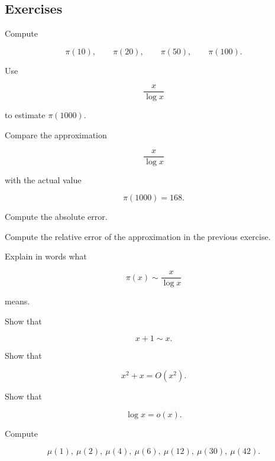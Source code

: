 \subsection{Exercises}
\label{subsec:analytic-number-theory-exercises}

\begin{exercise}[1]
Compute

\[ \pi(10),\qquad\pi(20),\qquad\pi(50),\qquad\pi(100). \]
\end{exercise}

\begin{exercise}[1]
Use

\[ \frac{x}{\log x} \]

to estimate \(\pi(1000)\).
\end{exercise}

\begin{exercise}[2]
Compare the approximation

\[ \frac{x}{\log x} \]

with the actual value

\[ \pi(1000)=168. \]

Compute the absolute error.
\end{exercise}

\begin{exercise}[2]
Compute the relative error of the approximation in the previous exercise.
\end{exercise}

\begin{exercise}[2]
Explain in words what

\[ \pi(x)\sim\frac{x}{\log x} \]

means.
\end{exercise}

\begin{exercise}[2]
Show that

\[ x+1\sim x. \]
\end{exercise}

\begin{exercise}[2]
Show that

\[ x^2+x=O(x^2). \]
\end{exercise}

\begin{exercise}[2]
Show that

\[ \log x=o(x). \]
\end{exercise}

\begin{exercise}[1]
Compute

\[ \mu(1),\ \mu(2),\ \mu(4),\ \mu(6),\ \mu(12),\ \mu(30),\ \mu(42). \]
\end{exercise}

